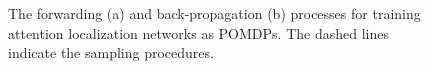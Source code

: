 \documentclass[10pt,twocolumn,letterpaper]{article}
\begin{document}
\begin{figure}[htb]
  \begin{center}
    \hspace{0.05in}%
  \end{center}
\caption{The forwarding (a) and back-propagation (b) processes for training attention localization networks as POMDPs. The dashed lines indicate the sampling procedures. }
\end{figure}
\end{document}
